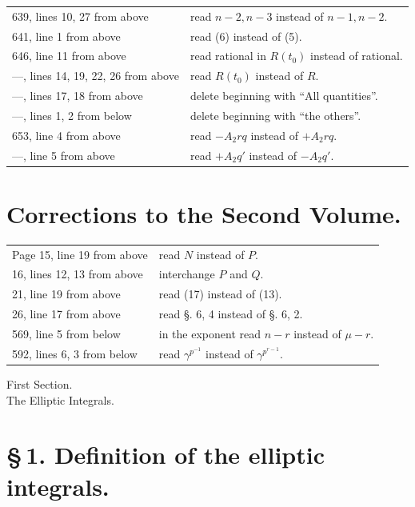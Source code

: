 \documentclass[11pt]{article}
\begin{document}
\begin{longtable}{p{}p{}}
639, lines 10, 27 from above & read $n-2,n-3$ instead of $n-1,n-2$.\\
641, line 1 from above & read (6) instead of (5).\\
646, line 11 from above & read rational in $R(t_0)$ instead of rational.\\
---, lines 14, 19, 22, 26 from above & read $R(t_0)$ instead of $R$.\\
---, lines 17, 18 from above & delete beginning with ``All quantities''.\\
---, lines 1, 2 from below & delete beginning with ``the others''.\\
653, line 4 from above & read $-A_2rq$ instead of $+A_2rq$.\\
---, line 5 from above & read $+A_2q'$ instead of $-A_2q'$.\\
\end{longtable}

\section*{Corrections to the Second Volume.}
\begin{longtable}{p{}p{}}
Page 15, line 19 from above & read $N$ instead of $P$.\\
16, lines 12, 13 from above & interchange $P$ and $Q$.\\
21, line 19 from above & read (17) instead of (13).\\
26, line 17 from above & read §. 6, 4 instead of §. 6, 2.\\
569, line 5 from below & in the exponent read $n-r$ instead of $\mu-r$.\\
592, lines 6, 3 from below & read $\gamma^{p^{-1}}$ instead of $\gamma^{p^{r-1}}$.\\
\end{longtable}


\clearpage
\begin{center}
{\large First Section.}\\[0.7em]
{\Large The Elliptic Integrals.}
\end{center}

\section*{\S\,1. Definition of the elliptic integrals.}
\end{document}

